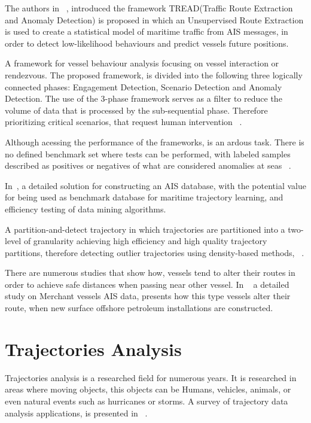 The authors in ~\cite{Pallotta2013}, introduced the framework TREAD(Traffic Route Extraction and Anomaly Detection) is proposed in which an Unsupervised Route Extraction is used to create a statistical model of maritime traffic from AIS messages, in order to detect low-likelihood behaviours and predict vessels future positions.

A framework for vessel behaviour analysis focusing on vessel interaction or rendezvous. The proposed framework, is divided into the following three logically connected phases: Engagement Detection, Scenario  Detection and Anomaly Detection. The use of the 3-phase framework serves as a filter to reduce the volume of data that is processed by the sub-sequential phase. Therefore prioritizing critical scenarios, that request human intervention ~\cite{Shahir2015}.

Although acessing the performance of the frameworks, is an ardous task. There is no defined benchmark set where tests can be performed, with labeled samples described as positives or negatives of what are considered anomalies at seas ~\cite{Laxhammar2008}. 

In~\cite{Mao2016}, a detailed solution for constructing an AIS database, with the potential value for being used as benchmark database for maritime trajectory learning, and efficiency testing of data mining algorithms.

A partition-and-detect trajectory in which trajectories are partitioned into a two-level of granularity achieving high efficiency and high quality trajectory partitions, therefore detecting outlier trajectories using density-based methods, ~\cite{Lee}.

There are numerous studies that show how, vessels tend to alter their routes in order to achieve safe distances when passing near other vessel. In ~\cite{2017Offshore} a detailed study on Merchant vessels AIS data, presents how this type vessels alter their route, when new surface offshore petroleum installations are constructed.

\section{Trajectories Analysis}
\label{section: Trajectory Analysis}
Trajectories analysis is a researched field for numerous years. It is researched in areas where moving objects, this objects can be Humans, vehicles, animals, or even natural events such as hurricanes or storms.
A survey of trajectory data analysis applications, is presented in ~\cite{Feng2016}.

